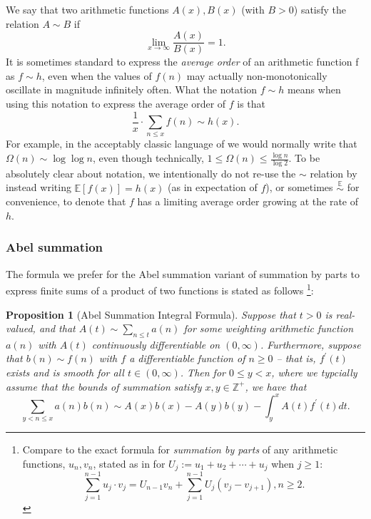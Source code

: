 \documentclass[11pt,reqno,a4letter]{article}
\numberwithin{figure}{section}
\numberwithin{table}{section}
\newcommand{\cf}{\textit{cf.\ }}
\theoremstyle{plain}
\newtheorem{prop}[theorem]{Proposition}
\numberwithin{theorem}{section}
\theoremstyle{definition}
\begin{document}
We say that two arithmetic functions $A(x), B(x)$ (with $B > 0$) satisfy the relation $A \sim B$ if 
\[
\lim_{x \rightarrow \infty} \frac{A(x)}{B(x)} = 1. 
\] 
It is sometimes standard to express the \emph{average order} of an arithmetic function f as 
$f \sim h$, even when the values of $f(n)$ may actually non-monotonically 
oscillate in magnitude infinitely often. What the notation $f \sim h$ means when using this 
notation to express the average order of $f$ is that 
$$\frac{1}{x} \cdot \sum_{n \leq x} f(n) \sim h(x).$$ 
For example, in the acceptably classic language of \cite{HARDYWRIGHT} we would normally write that 
$\Omega(n) \sim \log\log n$, even though technically, 
$1 \leq \Omega(n) \leq \frac{\log n}{\log 2}$. 
To be absolutely clear about notation, we intentionally do not re-use the $\sim$ relation by 
instead writing $\mathbb{E}[f(x)] = h(x)$ (as in expectation of $f$), or sometimes 
$\overset{\mathbb{E}}{\sim}$ for convenience,  
to denote that $f$ has a limiting average order growing at the 
rate of $h$. 


\subsubsection{Abel summation} 

The formula we prefer for the Abel summation variant of summation by parts 
to express finite sums of a product of two functions is stated as follows 
\cite[\cf \S 4.3]{APOSTOLANUMT} \footnote{
     Compare to the exact formula for \emph{summation by parts} of any arithmetic functions, $u_n,v_n$, 
     stated as in \cite[\S 2.10(ii)]{NISTHB} for $U_j := u_1+u_2+\cdots+u_j$ when $j \geq 1$: 
     \[
     \sum_{j=1}^{n-1} u_j \cdot v_j = U_{n-1} v_n + \sum_{j=1}^{n-1} U_j \left(v_j - v_{j+1}\right), n \geq 2. 
     \]
}: 
 
\begin{prop}[Abel Summation Integral Formula] 
\label{prop_AbelSummationFormula} 
Suppose that $t > 0$ is real-valued, and that $A(t) \sim \sum_{n \leq t} a(n)$ for some weighting 
arithmetic function $a(n)$ with $A(t)$ continuously differentiable on $(0, \infty)$. Furthermore, suppose that 
$b(n) \sim f(n)$ with $f$ a differentiable function of $n \geq 0$ -- that is, $f^{\prime}(t)$ exists and is smooth for all 
$t \in (0, \infty)$. 
Then for $0 \leq y < x$, where we typcially assume that the bounds of summation satisfy 
$x, y \in \mathbb{Z}^{+}$, we have that 
\[
\sum_{y < n \leq x} a(n) b(n) \sim A(x)b(x) - A(y)b(y) - \int_y^{x} A(t) f^{\prime}(t) dt. 
\] 
\end{prop}
          
\end{document}

